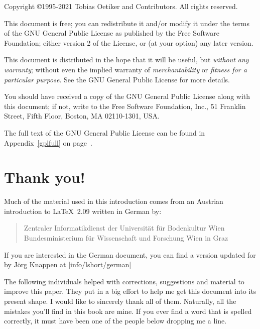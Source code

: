 \begin{small} 
  \noindent Copyright \copyright 1995-2021 Tobias Oetiker and Contributors.  All rights reserved.
 
  This document is free; you can redistribute it and/or modify it
  under the terms of the GNU General Public License as published by
  the Free Software Foundation; either version 2 of the License, or
  (at your option) any later version.
  
  This document is distributed in the hope that it will be useful, but
  \emph{without any warranty}; without even the implied warranty of
  \emph{merchantability} or \emph{fitness for a particular purpose}\@.  See the GNU
  General Public License for more details.
  
  You should have received a copy of the GNU General Public License
  along with this document; if not, write to the Free Software
  Foundation, Inc., 51 Franklin Street, Fifth Floor, Boston, MA 02110-1301, USA.

   \noindent The full text of the GNU General Public License can be found in Appendix~\ref{gplfull} on page~\pageref{gplfull}.
\end{small}

\chapter{Thank you!}
\noindent Much of the material used in this introduction comes from an
Austrian introduction to \LaTeX\ 2.09 written in German by:
\begin{verse}
%
{Zentraler Informatikdienst der Universit\"at f\"ur Bodenkultur Wien}
%
   {Bundesministerium f\"ur Wissenschaft und Forschung Wien}
%
   {in Graz}
\end{verse}

If you are interested in the German document, you can find a version
updated for \LaTeXe{} by J\"org Knappen at
\CTAN|info/lshort/german|

\newpage \noindent The
following individuals helped with corrections, suggestions and
material to improve this paper. They put in a big effort to help me
get this document into its present shape. I would like to
sincerely thank all of them. Naturally, all the mistakes you'll find
in this book are mine. If you ever find a word that is spelled
correctly, it must have been one of the people below dropping me a
line.

